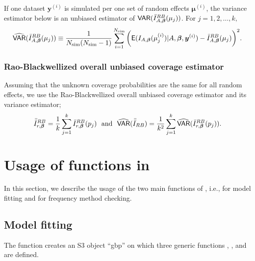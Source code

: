 \documentclass[article]{jss}
\begin{document}
If one dataset $\boldsymbol{y}^{(i)}$ is simulated per one set of random effects $\boldsymbol{\mu}^{(i)}$, the variance estimator below is an unbiased estimator of $\mathsf{VAR}(\bar{I}^{RB}_{A, \boldsymbol{\beta}}(\mu_j) )$. For $j=1, 2, \ldots, k,$
\begin{equation}\label{RBvar}
\widehat{\mathsf{VAR}}(\bar{I}^{RB}_{A, \boldsymbol{\beta}}(\mu_j) )\equiv\frac{1}{N_{\textrm{sim}}(N_{\textrm{sim}}-1)}\sum_{i=1}^{N_{\textrm{sim}}}\bigg(\mathsf{E}(I_{A, \boldsymbol{\beta}}(\mu_j^{(i)})\vert A, \boldsymbol{\beta}, \boldsymbol{y}^{(i)})-\bar{I}^{RB}_{A, \boldsymbol{\beta}}(\mu_j) \bigg)^{2}.
\end{equation}


\subsubsection{Rao-Blackwellized overall unbiased coverage estimator}\label{overallRB} Assuming that the unknown  coverage probabilities are the same for all random effects, we use the Rao-Blackwellized overall unbiased coverage estimator and its variance estimator;
\begin{equation}\label{RBoverall}
\bar{\bar{I}}^{RB}_{r, \boldsymbol{\beta}} = \frac{1}{k}\sum_{j=1}^k\bar{I}^{RB}_{r, \boldsymbol{\beta}}(p_j)~~\textrm{and}~~ \widehat{\mathsf{VAR}}(\bar{\bar{I}}_{RB})=\frac{1}{k^2}\sum_{j=1}^k\widehat{\mathsf{VAR}}(\bar{I}^{RB}_{r, \boldsymbol{\beta}}(p_j)).
\end{equation}


\section[packageoverview]{Usage of functions in }\label{sec5}
In this section, we describe the usage of the two main functions of , i.e.,  for model fitting and  for frequency method checking. 

\subsection{Model fitting}
The function  creates an S3 object ``gbp'' on which  three generic functions , , and  are defined. %
\end{document}
